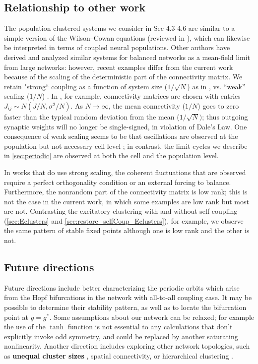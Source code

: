 \documentclass[reqno]{siamonline190516}
\newcommand{\revised}[1]{ \textbf{#1} }
\begin{document}
\subsection{Relationship to other work}
The population-clustered systems we consider in Sec 4.3-4.6 are similar to a simple version of the Wilson–Cowan equations (reviewed in \cite{et10,Chow_Y_JNeurophys_2020}), which can likewise be interpreted in terms of coupled neural populations. Other authors have derived and analyzed similar systems for balanced networks as a mean-field limit from large networks: however, recent examples differ from the current work because of the scaling of the deterministic part of the connectivity matrix. We retain "strong“ coupling as a function of system size ($1/\sqrt{N}$) as in \cite{RA06}, vs. “weak” scaling ($1/N$) \cite{hermann_etal_2012,kadmon_HS_2015,Schuessler_etal_PRR_2020}. In \cite{hermann_etal_2012}, for example, connectivity matrices are chosen with entries $J_{ij} \sim N(J/N, \sigma^2/N)$.  As $N \rightarrow \infty$, the mean connectivity ($1/N$) goes to zero faster than the typical random deviation from the mean ($1/\sqrt{N})$; thus  outgoing synaptic weights will no longer be single-signed, in violation of Dale’s Law. One consequence of weak scaling seems to be that oscillations are observed at the population but not necessary cell level \cite{Ginzburg_HS_1994,Brunel_Hakim_1999}; in contrast, the limit cycles we describe in \cref{sec:periodic} are observed at both the cell and the population level.
	
In works that do use strong scaling, the coherent fluctuations that are observed require a perfect orthogonality condition \cite{delMolino_etal_PRE_2013,Landau_HS_PCB_2018} or an external forcing \cite{Landau_HS_PRR_2021} to balance. Furthermore, the nonrandom part of the connectivity matrix is low rank; this is not the case in the current work, in which some examples are low rank but most are not. Contrasting the excitatory clustering with and without self-coupling (\cref{sec:Eclusters} and \cref{sec:restore_selfCoup_Eclusters}), for example, we observe the same pattern of stable fixed points although one is low rank and the other is not.


\subsection{Future directions}

Future directions include better characterizing the periodic orbits which arise from the Hopf bifurcations in the network with all-to-all coupling case. It may be possible to determine their stability pattern, as well as to locate the bifurcation point at $g=g^*$. Some assumptions about our network can be relaxed; for example the use of the $\tanh$ function is not essential to any calculations that don't explicitly invoke odd symmetry, and could be replaced by another saturating nonlinearity. Another direction includes exploring other network topologies, such as \revised{unequal cluster sizes}, spatial connectivity, or hierarchical clustering \cite{rosenbaum17,Ebsch_RR_PlosCB_2018}. 
\end{document}

